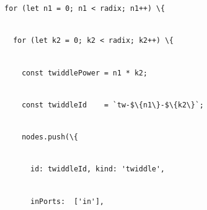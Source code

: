 \documentclass[
]{article}
\newcommand{\passthrough}[1]{#1}
\begin{document}
\passthrough{\lstinline!  !}\passthrough{\lstinline!for!}\passthrough{\lstinline! !}\passthrough{\lstinline!(let!}\passthrough{\lstinline! !}\passthrough{\lstinline!n1!}\passthrough{\lstinline! !}\passthrough{\lstinline!=!}\passthrough{\lstinline! !}\passthrough{\lstinline!0;!}\passthrough{\lstinline! !}\passthrough{\lstinline!n1!}\passthrough{\lstinline! !}\passthrough{\lstinline!<!}\passthrough{\lstinline! !}\passthrough{\lstinline!radix;!}\passthrough{\lstinline! !}\passthrough{\lstinline!n1++)!}\passthrough{\lstinline! !}\passthrough{\lstinline!\{!}\strut \\
\passthrough{\lstinline!    !}\passthrough{\lstinline!for!}\passthrough{\lstinline! !}\passthrough{\lstinline!(let!}\passthrough{\lstinline! !}\passthrough{\lstinline!k2!}\passthrough{\lstinline! !}\passthrough{\lstinline!=!}\passthrough{\lstinline! !}\passthrough{\lstinline!0;!}\passthrough{\lstinline! !}\passthrough{\lstinline!k2!}\passthrough{\lstinline! !}\passthrough{\lstinline!<!}\passthrough{\lstinline! !}\passthrough{\lstinline!radix;!}\passthrough{\lstinline! !}\passthrough{\lstinline!k2++)!}\passthrough{\lstinline! !}\passthrough{\lstinline!\{!}\strut \\
\passthrough{\lstinline!      !}\passthrough{\lstinline!const!}\passthrough{\lstinline! !}\passthrough{\lstinline!twiddlePower!}\passthrough{\lstinline! !}\passthrough{\lstinline!=!}\passthrough{\lstinline! !}\passthrough{\lstinline!n1!}\passthrough{\lstinline! !}\passthrough{\lstinline!*!}\passthrough{\lstinline! !}\passthrough{\lstinline!k2;!}\strut \\
\passthrough{\lstinline!      !}\passthrough{\lstinline!const!}\passthrough{\lstinline! !}\passthrough{\lstinline!twiddleId!}\passthrough{\lstinline!    !}\passthrough{\lstinline!=!}\passthrough{\lstinline! !}\passthrough{\lstinline!`!}\passthrough{\lstinline!tw!}\passthrough{\lstinline!-$\{n1\}-$\{k2\}`;!}\strut \\
\passthrough{\lstinline!      !}\passthrough{\lstinline!nodes.push!}\passthrough{\lstinline!(\{!}\strut \\
\passthrough{\lstinline!        !}\passthrough{\lstinline!id:!}\passthrough{\lstinline! !}\passthrough{\lstinline!twiddleId!}\passthrough{\lstinline!,!}\passthrough{\lstinline! !}\passthrough{\lstinline!kind:!}\passthrough{\lstinline! !}\passthrough{\lstinline!'twiddle',!}\strut \\
\passthrough{\lstinline!        !}\passthrough{\lstinline!inPorts!}\passthrough{\lstinline!:!}\passthrough{\lstinline!  !}\passthrough{\lstinline!['in'],!}\strut \\
\end{document}
